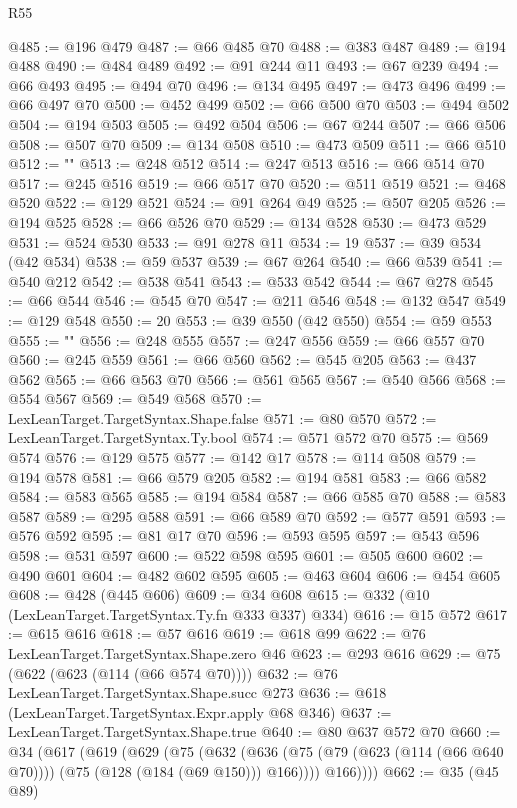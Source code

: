 \begin{lexlean}{R55}
\begin{coremodule}
@485 := @196 @479
@487 := @66 @485 @70
@488 := @383 @487
@489 := @194 @488
@490 := @484 @489
@492 := @91 @244 @11
@493 := @67 @239
@494 := @66 @493
@495 := @494 @70
@496 := @134 @495
@497 := @473 @496
@499 := @66 @497 @70
@500 := @452 @499
@502 := @66 @500 @70
@503 := @494 @502
@504 := @194 @503
@505 := @492 @504
@506 := @67 @244
@507 := @66 @506
@508 := @507 @70
@509 := @134 @508
@510 := @473 @509
@511 := @66 @510
@512 := "{"
@513 := @248 @512
@514 := @247 @513
@516 := @66 @514 @70
@517 := @245 @516
@519 := @66 @517 @70
@520 := @511 @519
@521 := @468 @520
@522 := @129 @521
@524 := @91 @264 @49
@525 := @507 @205
@526 := @194 @525
@528 := @66 @526 @70
@529 := @134 @528
@530 := @473 @529
@531 := @524 @530
@533 := @91 @278 @11
@534 := 19
@537 := @39 @534 (@42 @534)
@538 := @59 @537
@539 := @67 @264
@540 := @66 @539
@541 := @540 @212
@542 := @538 @541
@543 := @533 @542
@544 := @67 @278
@545 := @66 @544
@546 := @545 @70
@547 := @211 @546
@548 := @132 @547
@549 := @129 @548
@550 := 20
@553 := @39 @550 (@42 @550)
@554 := @59 @553
@555 := "}"
@556 := @248 @555
@557 := @247 @556
@559 := @66 @557 @70
@560 := @245 @559
@561 := @66 @560
@562 := @545 @205
@563 := @437 @562
@565 := @66 @563 @70
@566 := @561 @565
@567 := @540 @566
@568 := @554 @567
@569 := @549 @568
@570 := LexLeanTarget.TargetSyntax.Shape.false
@571 := @80 @570
@572 := LexLeanTarget.TargetSyntax.Ty.bool
@574 := @571 @572 @70
@575 := @569 @574
@576 := @129 @575
@577 := @142 @17
@578 := @114 @508
@579 := @194 @578
@581 := @66 @579 @205
@582 := @194 @581
@583 := @66 @582
@584 := @583 @565
@585 := @194 @584
@587 := @66 @585 @70
@588 := @583 @587
@589 := @295 @588
@591 := @66 @589 @70
@592 := @577 @591
@593 := @576 @592
@595 := @81 @17 @70
@596 := @593 @595
@597 := @543 @596
@598 := @531 @597
@600 := @522 @598 @595
@601 := @505 @600
@602 := @490 @601
@604 := @482 @602 @595
@605 := @463 @604
@606 := @454 @605
@608 := @428 (@445 @606)
@609 := @34 @608
@615 := @332 (@10 (LexLeanTarget.TargetSyntax.Ty.fn @333 @337) @334)
@616 := @15 @572
@617 := @615 @616
@618 := @57 @616
@619 := @618 @99
@622 := @76 LexLeanTarget.TargetSyntax.Shape.zero @46
@623 := @293 @616
@629 := @75 (@622 (@623 (@114 (@66 @574 @70))))
@632 := @76 LexLeanTarget.TargetSyntax.Shape.succ @273
@636 := @618 (LexLeanTarget.TargetSyntax.Expr.apply @68 @346)
@637 := LexLeanTarget.TargetSyntax.Shape.true
@640 := @80 @637 @572 @70
@660 := @34
    (@617
      (@619
        (@629
          (@75
            (@632
              (@636 (@75 (@79 (@623 (@114 (@66 @640 @70)))) (@75 (@128 (@184 (@69 @150))) @166))))
            @166))))
@662 := @35 (@45 @89)

\end{coremodule}
\end{lexlean}
